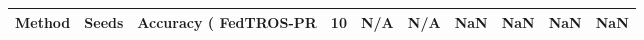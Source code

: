 \begin{tabular}{lrllrrrr}
\toprule
Method & Seeds & Accuracy (%
\midrule
FedTROS-PR & 10 & N/A & N/A & NaN & NaN & NaN & NaN \\
\bottomrule
\end{tabular}
